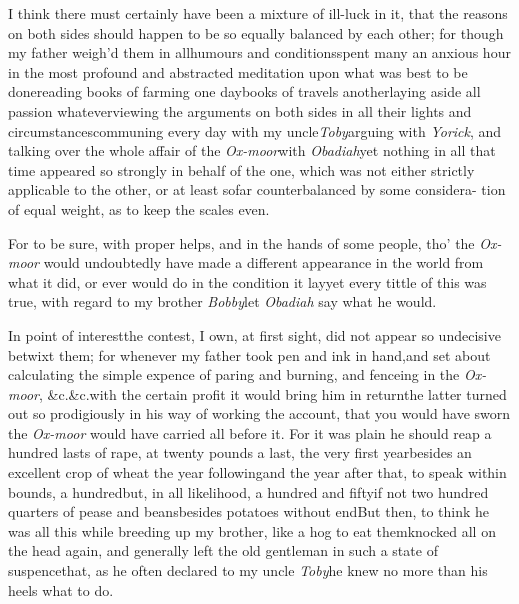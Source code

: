 \documentclass{article}
\begin{document}
I think there must certainly have been a mixture of ill-luck in
it, that the reasons on both sides should happen to be so equally
balanced by each other; for though my father weigh’d them in
all\break humours and conditions\tsk spent many an anxious hour
in the most profound and abstracted meditation upon what was\break
best to be done\tsh reading books of farming one
day\tsk books of travels another\tsk laying aside
all passion whatever\break\tsk viewing the arguments on both sides in
all their lights and circumstances\tsk\break communing every day with
my uncle\break \textit{Toby}\tsk arguing with \textit{Yorick}, and talking
over the whole affair of the \textit{Ox-moor}\break with
\textit{Obadiah}\tsk yet nothing in all that time appeared
so strongly in behalf of the one, which was not either
strictly\break
applicable to the other, or at least so\break far counterbalanced
by some considera-
tion of equal weight, as to keep the scales even.

For to be sure, with proper helps,\break
and in the hands of some people, tho’\break
the \textit{Ox-moor} would undoubtedly have\break
made a different appearance in the world from what it did, or ever would
do in the condition it lay\tsk yet every tittle of this
was true, with regard to my brother \textit{Bobby}\tsk let
\textit{Obadiah} say what he\break
would.\tsh

In point of interest\tsk the contest, I own, at first
sight, did not appear so\break
undecisive betwixt them; for whenever my
father took pen and ink in hand,\break and set about calculating the
simple expence of paring and burning, and fence\-ing in the
\textit{Ox-moor}, \&c.\@ \&c.\tsk with the\break
certain profit it would bring him in return\tsk the latter turned out so
prodigiously in his way of working the account, that you would have
sworn the \textit{Ox-moor} would have carried all before it. For it
was plain he should reap a hundred lasts of rape, at twenty pounds a last, the very first
year\tsk besides an excellent crop of wheat the year
following\tsk and the year after that, to speak within
bounds, a hundred\tsh but, in all likelihood, a hundred and
fifty\tsk if not two hundred quarters of pease and
beans\tsk besides potatoes without end\tsk But
then, to think he was all this while breeding up my brother, like a
hog to eat them\tsk knocked all on the head again, and
generally left the old gentleman in such a state of
suspence\tsk that, as he often declared to my uncle
\textit{Toby}\tsk he knew no more than his heels what to
do.
\end{document}
